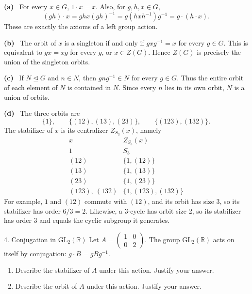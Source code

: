 \documentclass[11pt,letterpaper]{article}
\newcommand{\partlabel}[1]{\par\textbf{(#1)}\ }
\begin{document}
\begin{solution}
\partlabel{a} For every $x\in G$, $1\cdot x=x$. Also, for $g,h,x\in G$,
\[
 (gh)\cdot x=ghx(gh)^{-1}=g(hxh^{-1})g^{-1}=g\cdot(h\cdot x).
\]
These are exactly the axioms of a left group action.
\partlabel{b} The orbit of $x$ is a singleton if and only if $gxg^{-1}=x$ for every $g\in G$. This is equivalent to $gx=xg$ for every $g$, or $x\in Z(G)$. Hence $Z(G)$ is precisely the union of the singleton orbits.
\partlabel{c} If $N\trianglelefteq G$ and $n\in N$, then $gng^{-1}\in N$ for every $g\in G$. Thus the entire orbit of each element of $N$ is contained in $N$. Since every $n$ lies in its own orbit, $N$ is a union of orbits.
\partlabel{d} The three orbits are
\[
 \{1\},\qquad \{(12),(13),(23)\},\qquad \{(123),(132)\}.
\]
The stabilizer of $x$ is its centralizer $Z_{S_3}(x)$, namely
\[
\begin{array}{c|l}
 x & Z_{S_3}(x)\\ \hline
 1 & S_3\\
 (12)&\{1,(12)\}\\
 (13)&\{1,(13)\}\\
 (23)&\{1,(23)\}\\
 (123),\ (132)&\{1,(123),(132)\}
\end{array}
\]
For example, $1$ and $(12)$ commute with $(12)$, and its orbit has size $3$, so its stabilizer has order $6/3=2$. Likewise, a $3$-cycle has orbit size $2$, so its stabilizer has order $3$ and equals the cyclic subgroup it generates.
\end{solution}
\newpage
\begin{questionblock}{4. Conjugation in $\mathrm{GL}_2(\mathbb R)$}
Let $A=\begin{pmatrix}1&0\\0&2\end{pmatrix}$. The group $\mathrm{GL}_2(\mathbb R)$ acts on itself by conjugation: $g\cdot B=gBg^{-1}$.
\begin{enumerate}[label=(\alph*)]
\item Describe the stabilizer of $A$ under this action. Justify your answer.
\item Describe the orbit of $A$ under this action. Justify your answer.
\end{enumerate}
\end{questionblock}
\end{document}
